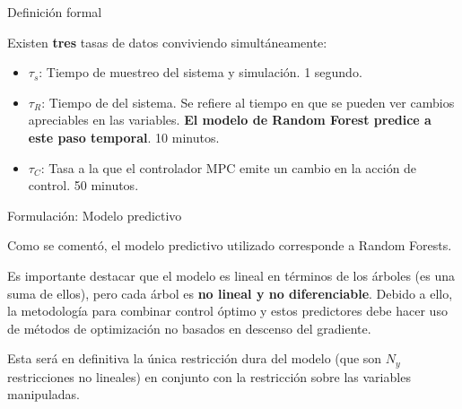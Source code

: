 \documentclass{beamer}
\begin{document}
\begin{myFrame}{Definición formal}
\framebreak

Existen \textbf{tres} tasas de datos conviviendo simultáneamente:
\begin{itemize}
\item $\tau_s$: Tiempo de muestreo del sistema y simulación. 1 segundo.
\item $\tau_R$: Tiempo de  del sistema. Se refiere al tiempo en que se pueden ver cambios apreciables en las variables. \textbf{El modelo de Random Forest predice a este paso temporal}. 10 minutos.
\item $\tau_C$: Tasa a la que el controlador MPC emite un cambio en la acción de control. 50 minutos.
\end{itemize}


\end{myFrame}
\begin{myFrame}{Formulación: Modelo predictivo}

Como se comentó, el modelo predictivo utilizado corresponde a Random Forests. 

Es importante destacar que el modelo es lineal en términos de los árboles (es una suma de ellos), pero cada árbol es \textbf{no lineal y no diferenciable}. Debido a ello, la metodología para combinar control óptimo y estos predictores debe hacer uso de métodos de optimización no basados en descenso del gradiente.

Esta será en definitiva la única restricción dura del modelo (que son $N_y$ restricciones no lineales) en conjunto con la restricción sobre las variables manipuladas.

\end{myFrame}
\end{document}
